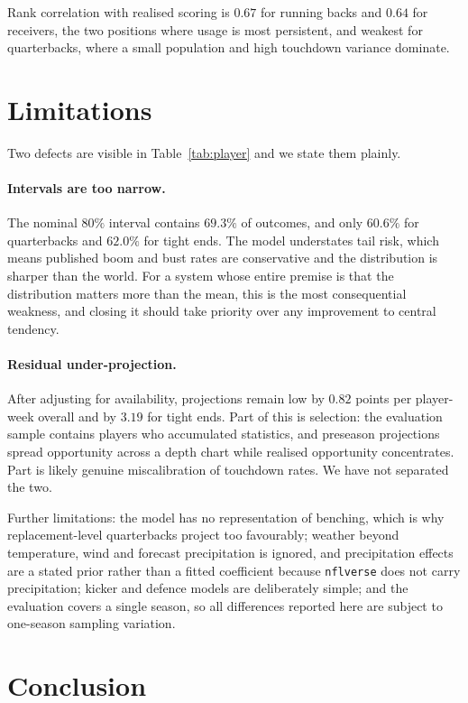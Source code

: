 \documentclass[11pt,a4paper]{article}
\begin{document}
Rank correlation with realised scoring is $0.67$ for running backs and $0.64$
for receivers, the two positions where usage is most persistent, and weakest for
quarterbacks, where a small population and high touchdown variance dominate.

\section{Limitations}

Two defects are visible in Table~\ref{tab:player} and we state them plainly.

\paragraph{Intervals are too narrow.}
The nominal $80\%$ interval contains $69.3\%$ of outcomes, and only $60.6\%$ for
quarterbacks and $62.0\%$ for tight ends. The model understates tail risk, which
means published boom and bust rates are conservative and the distribution is
sharper than the world. For a system whose entire premise is that the
distribution matters more than the mean, this is the most consequential
weakness, and closing it should take priority over any improvement to central
tendency.

\paragraph{Residual under-projection.}
After adjusting for availability, projections remain low by $0.82$ points per
player-week overall and by $3.19$ for tight ends. Part of this is selection: the
evaluation sample contains players who accumulated statistics, and preseason
projections spread opportunity across a depth chart while realised opportunity
concentrates. Part is likely genuine miscalibration of touchdown rates. We have
not separated the two.

Further limitations: the model has no representation of benching, which is why
replacement-level quarterbacks project too favourably; weather beyond
temperature, wind and forecast precipitation is ignored, and precipitation
effects are a stated prior rather than a fitted coefficient because
\texttt{nflverse} does not carry precipitation; kicker and defence models are
deliberately simple; and the evaluation covers a single season, so all
differences reported here are subject to one-season sampling variation.

\section{Conclusion}
\end{document}
